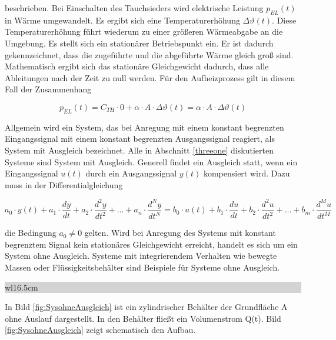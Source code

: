 \noindent beschrieben. Bei Einschalten des Tauchsieders wird elektrische Leistung $p_{EL}(t)$ in Wärme umgewandelt.
Es ergibt sich eine Temperaturerhöhung $\Delta\vartheta(t)$. Diese Temperaturerhöhung führt wiederum zu einer größeren Wärmeabgabe an die Umgebung. Es stellt sich ein stationärer Betriebspunkt ein. Er ist dadurch gekennzeichnet, dass die zugeführte und die abgeführte Wärme gleich groß sind. Mathematisch ergibt sich das stationäre Gleichgewicht dadurch, dass alle Ableitungen nach der Zeit zu null werden. Für den Aufheizprozess gilt in diesem Fall der Zusammenhang

\begin{equation}\label{eq:threefiftyfive}
p_{EL}(t) = C_{TH}\cdot 0 + \alpha\cdot A \cdot \Delta\vartheta(t) =\alpha\cdot A \cdot \Delta\vartheta(t)
\end{equation}

\noindent Allgemein wird ein System, das bei Anregung mit einem konstant begrenzten Eingangssignal mit einem konstant begrenzten Ausgangssignal reagiert, als System mit Ausgleich bezeichnet. Alle in Abschnitt \ref{threeone} diskutierten Systeme sind System mit Ausgleich. Generell findet ein Ausgleich statt, wenn ein Eingangssignal $u(t)$ durch ein Ausgangssignal $y(t)$ kompensiert wird. Dazu muss in der Differentialgleichung

\begin{equation}\label{eq:threefiftysix}
a_{0}\cdot y(t) + a_{1}\cdot \frac{dy}{dt}+a_{2}\cdot \frac{d^2y}{dt^2}+ ... +a_{n}\cdot \frac{d^Ny}{dt^N}=
b_{0}\cdot u(t) + b_{1}\cdot \frac{du}{dt}+b_{2}\cdot \frac{d^2u}{dt^2}+ ... +b_{m}\cdot \frac{d^Mu}{dt^M}
\end{equation}

\noindent die Bedingung $a_{0} \neq  0$  gelten. Wird bei Anregung des Systems mit konstant begrenztem Signal kein stationäres Gleichgewicht erreicht, handelt es sich um ein System ohne Ausgleich. Systeme mit integrierendem Verhalten wie bewegte Massen oder Flüssigkeitsbehälter sind Beispiele für Systeme ohne Ausgleich.\bigskip

\noindent
\colorbox{lightgray}{%
%
\renewcommand\arraystretch{0.6}%
\begin{tabular}{ wl{16.5cm} }
{\selectfont{Beispiel: System ohne Ausgleich}}
\end{tabular}%
}\bigskip

\noindent In Bild \ref{fig:SysohneAusgleich} ist ein zylindrischer Behälter der Grundfläche A ohne Auslauf dargestellt. In den Behälter fließt ein Volumenstrom Q(t). Bild \ref{fig:SysohneAusgleich} zeigt schematisch den Aufbau.

